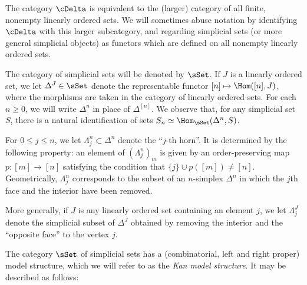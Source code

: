 \begin{Model Categories}
\begin{Didn't Read}
\begin{remark}
The category $\cDelta$ is equivalent to the (larger) category of all finite, nonempty linearly ordered sets. We will sometimes abuse notation by identifying $\cDelta$ with this larger subcategory, and regarding simplicial sets (or more general simplicial objects) as functors which are defined on all nonempty linearly ordered sets.
\end{remark}

\begin{notation}
The category of simplicial sets will be denoted by $\sSet$.
If $J$ is a linearly ordered set, we let $\Delta^J \in \sSet$ denote the
representable functor 
$[n] \mapsto \Hom( [n], J)$, where the morphisms are taken in the category of linearly ordered sets. For each $n \geq 0$, we will write
$\Delta^{n}$ in place of $\Delta^{[n]}$. We observe that, for any simplicial set $S$, there
is a natural identification of sets $S_{n} \simeq \Hom_{\sSet}(\Delta^n, S)$.
\end{notation}

\begin{example}
For $0 \leq j \leq n$, we let $\Lambda^n_j \subset \Delta^n$
denote the ``$j$-th horn''. It is determined by the following
property: an element of $(\Lambda^n_j)_m$ is given by an
order-preserving map $p: [m] \rightarrow [n]$ satisfying the condition that 
$\{j \} \cup p( [m] ) \neq [n]$. Geometrically,
$\Lambda^n_j$ corresponds to the subset of an $n$-simplex
$\Delta^n$ in which the $j$th face and the interior have been
removed.

More generally, if $J$ is any linearly ordered set containing an element $j$, we let
$\Lambda^J_j$ denote the simplicial subset of $\Delta^J$ obtained by removing the interior
and the ``opposite face'' to the vertex $j$.
\end{example}

The category $\sSet$ of simplicial sets has a (combinatorial, left and right proper) model structure, which we will refer to as the {\it Kan model structure}. It may be described as follows:


\end{Didn't Read}
\end{Model Categories}
